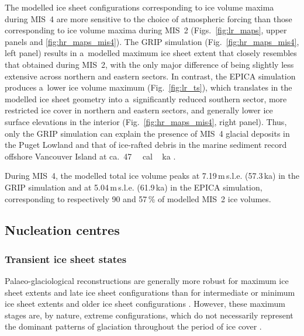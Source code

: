 \documentclass[tc, manuscript]{copernicus}
\begin{document}
      The modelled ice sheet configurations corresponding to ice volume
      maxima during MIS~4 are more sensitive to the choice of atmospheric
      forcing than those corresponding to ice volume maxima during MIS~2
      (Figs.~\ref{fig:lr_maps}, upper panels and \ref{fig:hr_maps_mis4}).
      The GRIP simulation (Fig.~\ref{fig:hr_maps_mis4}, left panel) results
      in a~modelled maximum ice sheet extent that closely resembles that
      obtained during MIS~2, with the only major difference of being
      slightly less extensive across northern and eastern sectors. In
      contrast, the EPICA simulation produces a~lower ice volume maximum
      (Fig.~\ref{fig:lr_ts}), which translates in the modelled ice sheet
      geometry into a~significantly reduced southern sector, more restricted
      ice cover in northern and eastern sectors, and generally lower ice
      surface elevations in the interior (Fig.~\ref{fig:hr_maps_mis4}, right
      panel). Thus, only the GRIP simulation can explain the presence of
      MIS~4 glacial deposits in the Puget Lowland \citep{Troost.2014} and
      that of ice-rafted debris in the marine sediment record offshore
      Vancouver Island at ca.~47\,\unit{\,cal\,ka}
      \citep{Cosma.etal.2008}.

      During MIS~4, the modelled total ice volume peaks at
      7.19\,\unit{m}\,s.l.e. (57.3\,\unit{ka}) in the GRIP simulation and at
      5.04\,\unit{m}\,s.l.e. (61.9\,\unit{ka}) in the EPICA simulation,
      corresponding to respectively 90 and 57\,\unit{\%} of modelled MIS~2
      ice volumes.

\subsection{Nucleation centres}

\subsubsection{Transient ice sheet states}

      Palaeo-glaciological reconstructions are generally more robust for
      maximum ice sheet extents and late ice sheet configurations than for
      intermediate or minimum ice sheet extents and older ice sheet
      configurations \citep{Kleman.etal.2010}. However, these maximum stages
      are, by nature, extreme configurations, which do not necessarily
      represent the dominant patterns of glaciation throughout the period of
      ice cover \citep{Porter.1989, Kleman.Stroeven.1997, Kleman.etal.2008,
      Kleman.etal.2010}.
\end{document}
